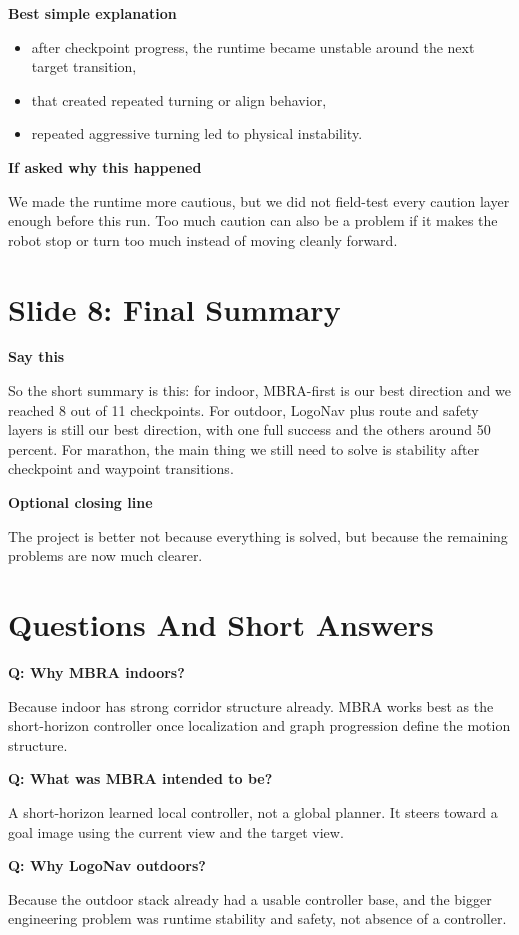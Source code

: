 \documentclass[11pt]{article}
\begin{document}
\textbf{Best simple explanation}
\begin{itemize}[leftmargin=*]
\item after checkpoint progress, the runtime became unstable around the next target transition,
\item that created repeated turning or align behavior,
\item repeated aggressive turning led to physical instability.
\end{itemize}

\textbf{If asked why this happened}

We made the runtime more cautious, but we did not field-test every caution layer enough before this run. Too much caution can also be a problem if it makes the robot stop or turn too much instead of moving cleanly forward.

\section*{Slide 8: Final Summary}
\textbf{Say this}

So the short summary is this: for indoor, MBRA-first is our best direction and we reached 8 out of 11 checkpoints. For outdoor, LogoNav plus route and safety layers is still our best direction, with one full success and the others around 50 percent. For marathon, the main thing we still need to solve is stability after checkpoint and waypoint transitions.

\textbf{Optional closing line}

The project is better not because everything is solved, but because the remaining problems are now much clearer.

\section*{Questions And Short Answers}
\textbf{Q: Why MBRA indoors?}

Because indoor has strong corridor structure already. MBRA works best as the short-horizon controller once localization and graph progression define the motion structure.

\textbf{Q: What was MBRA intended to be?}

A short-horizon learned local controller, not a global planner. It steers toward a goal image using the current view and the target view.

\textbf{Q: Why LogoNav outdoors?}

Because the outdoor stack already had a usable controller base, and the bigger engineering problem was runtime stability and safety, not absence of a controller.
\end{document}
